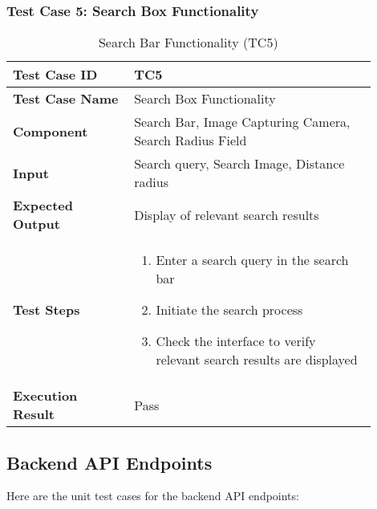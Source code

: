 \pagebreak
\begin{table}[h]
	\subsubsection{Test Case 5: Search Box Functionality}
	\centering
	\caption{Search Bar Functionality (TC5)}
	\begin{tabular}{|p{0.3\linewidth}|p{0.6\linewidth}|}
		\hline
		\textbf{Test Case ID} & TC5 \\
		\hline
		\textbf{Test Case Name} & Search Box Functionality \\
		\hline
		\textbf{Component} & Search Bar, Image Capturing Camera, Search Radius Field \\
		\hline
		\textbf{Input} & Search query, Search Image, Distance radius \\
		\hline
		\textbf{Expected Output} & Display of relevant search results \\
		\hline
		\textbf{Test Steps} & 
		\begin{enumerate}
			\item Enter a search query in the search bar
			\item Initiate the search process
			\item Check the interface to verify relevant search results are displayed
		\end{enumerate} \\
		\hline
		\textbf{Execution Result} & Pass \\
		\hline
	\end{tabular}
\end{table}


\subsection{Backend API Endpoints}

Here are the unit test cases for the backend API endpoints:

